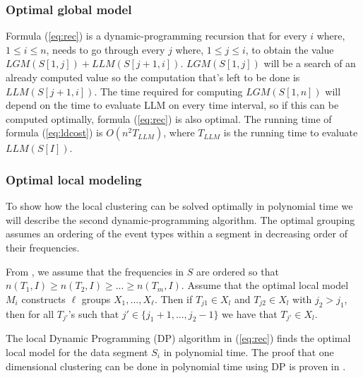 \subsubsection{Optimal global model}
Formula (\ref{eq:rec}) is a dynamic-programming recursion that for every $i$ where, $1 \leq i \leq n$, needs to go through every $j$ where, $1 \leq j \leq i$, to obtain the value $LGM(S[1,j])+LLM(S[j+1,i])$. $LGM(S[1,j])$ will be a search of an already computed value so the computation that's left to be done is $LLM(S[j+1,i])$. The time required for computing $LGM(S[1,n])$ will depend on the time to evaluate LLM on every time interval, so if this can be computed optimally, formula (\ref{eq:rec}) is also optimal. The running time of formula (\ref{eq:ldcost}) is $O(n^2T_{LLM})$, where $T_{LLM}$ is the running time to evaluate $LLM(S[I])$. 

\subsubsection{Optimal local modeling}
To show how the local clustering can be solved optimally in polynomial time we will describe the second dynamic-programming algorithm. The optimal grouping assumes an ordering of the event types within a segment in decreasing order of their frequencies.

From \cite{Kiernan:constructing}, we assume that the frequencies in $S$ are ordered so that $n(T_1,I) \geq n(T_2,I) \geq ... \geq n(T_m,I)$. Assume that the optimal local model $M_i $ constructs $\ell$ groups $X_1, ..., X_{\ell}$. Then if $T_{j1} \in X_{l}$ and $T_{j2} \in X_{l}$ with $j_2 > j_1$, then for all $T_{j'}$'s such that $j' \in \{j_1+1,...,j_2-1\}$ we have that $T_{j'} \in X_l$.
 
The local Dynamic Programming (DP) algorithm in (\ref{eq:rec}) finds the optimal local model for the data segment $S_i$ in polynomial time. The proof that one dimensional clustering can be done in polynomial time using DP is proven in \cite{bellman:dynamic}.



